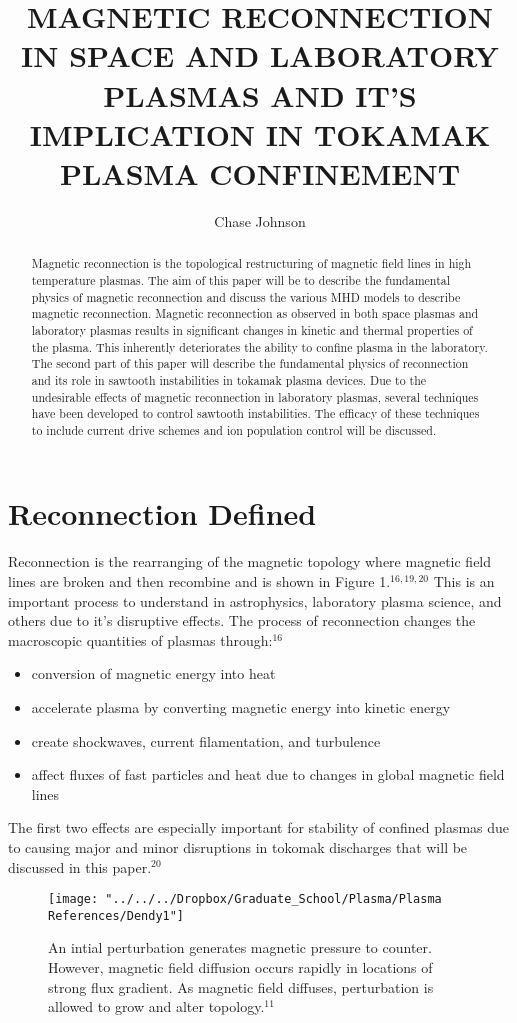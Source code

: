 \documentclass{article}
\begin{document}
\title{MAGNETIC RECONNECTION IN SPACE AND LABORATORY PLASMAS AND IT’S IMPLICATION IN TOKAMAK PLASMA CONFINEMENT}
\author{Chase Johnson}

\maketitle

\begin{abstract}
Magnetic reconnection is the topological restructuring of magnetic field lines in high temperature plasmas.    The aim of this paper will be to describe the fundamental physics of magnetic reconnection and discuss the various MHD models to describe magnetic reconnection.  Magnetic reconnection as observed in both space plasmas and laboratory plasmas results in significant changes in kinetic and thermal properties of the plasma.  This inherently deteriorates the ability to confine plasma in the laboratory.  The second part of this paper will describe the fundamental physics of reconnection and its role in sawtooth instabilities in tokamak plasma devices.  Due to the undesirable effects of magnetic reconnection in laboratory plasmas, several techniques have been developed to control sawtooth instabilities.  The efficacy of these techniques to include current drive schemes and ion population control will be discussed.
\end{abstract}
\section{Reconnection Defined}
Reconnection is the rearranging of the magnetic topology where magnetic field lines are broken and then recombine and is shown in Figure 1.$^{16,19,20}$  This is an important process to understand in astrophysics, laboratory plasma science, and others due to it's disruptive effects.  The process of reconnection changes the macroscopic quantities of plasmas through:$^{16}$
\begin{itemize}
\item conversion of magnetic energy into heat
\item accelerate plasma by converting magnetic energy into kinetic energy
\item create shockwaves, current filamentation, and turbulence
\item affect fluxes of fast particles and heat due to changes in global magnetic field lines
\end{itemize}
The first two effects are especially important for stability of confined plasmas due to causing major and minor disruptions in tokomak discharges that will be discussed in this paper.$^{20}$
\begin{figure}[h]
\centering
\texttt{[image: "../../../Dropbox/Graduate\_School/Plasma/Plasma References/Dendy1"]}
\caption{An intial perturbation generates magnetic pressure to counter. However, magnetic field diffusion occurs rapidly in locations of strong flux gradient. As magnetic field diffuses, perturbation is allowed to grow and alter topology.$^{11}$}
\label{fig:Dendy1}
\end{figure}
\end{document}
